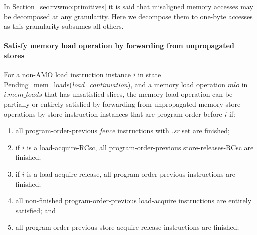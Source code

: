 \begin{commentary}
In Section~\ref{sec:rvwmo:primitives} it is said that misaligned memory accesses may be decomposed at any granularity.
Here we decompose them to one-byte accesses as this granularity subsumes all others.
\end{commentary}

\paragraph{Satisfy memory load operation by forwarding from unpropagated stores}\label{omm:sat_by_forwarding}
For a non-AMO load instruction instance $i$ in state {\sc Pending\_mem\_loads}({\it load\_continuation}), and a memory load operation $mlo$ in $i.\textit{mem\_loads}$ that has unsatisfied slices, the memory load operation can be partially or entirely satisfied by forwarding from unpropagated memory store operations by store instruction instances that are program-order-before $i$ if:
\begin{enumerate}
\item all program-order-previous {\em fence} instructions with {\em .sr} set are finished;
\item if $i$ is a load-acquire-RCsc, all program-order-previous store-releases-RCsc are finished;
\item if $i$ is a load-acquire-release, all program-order-previous instructions are finished;
\item all non-finished program-order-previous load-acquire instructions are entirely satisfied; and
\item all program-order-previous store-acquire-release instructions are finished;
\end{enumerate}

